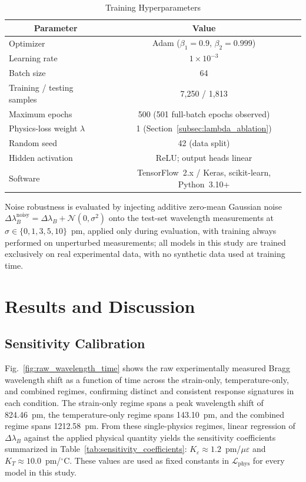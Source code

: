 \documentclass[journal,twoside,web]{ieeecolor}
\begin{document}
\begin{table}[!t]
\caption{Training Hyperparameters}
\label{tab:training_hyperparams}
\centering
\renewcommand{\arraystretch}{1.15}
\begin{tabular}{|l|c|}
\hline
\multicolumn{1}{|c|}{\textbf{Parameter}} & \textbf{Value} \\
\hline
Optimizer & Adam ($\beta_1{=}0.9$, $\beta_2{=}0.999$) \\
Learning rate & $1\times 10^{-3}$ \\
Batch size & 64 \\
Training / testing samples & 7{,}250 / 1{,}813 \\
Maximum epochs & 500 (501 full-batch epochs observed) \\
Physics-loss weight $\lambda$ & 1 (Section~\ref{subsec:lambda_ablation}) \\
Random seed & 42 (data split) \\
Hidden activation & ReLU; output heads linear \\
Software & TensorFlow~2.x / Keras, scikit-learn, Python~3.10+ \\
\hline
\end{tabular}
\end{table}

Noise robustness is evaluated by injecting additive zero-mean Gaussian noise
$\Delta\lambda_B^{\text{noisy}} = \Delta\lambda_B + \mathcal{N}(0,\sigma^2)$
onto the test-set wavelength measurements at $\sigma \in \{0, 1, 3, 5,
10\}$~pm, applied only during evaluation, with training always performed on
unperturbed measurements; all models in this study are trained exclusively
on real experimental data, with no synthetic data used at training time.


\section{Results and Discussion}
\label{sec:results}

\subsection{Sensitivity Calibration}
\label{subsec:sensitivity_calibration}

Fig.~\ref{fig:raw_wavelength_time} shows the raw experimentally measured
Bragg wavelength shift as a function of time across the strain-only,
temperature-only, and combined regimes, confirming distinct and consistent
response signatures in each condition. The strain-only regime spans a peak
wavelength shift of 824.46~pm, the temperature-only regime spans 143.10~pm,
and the combined regime spans 1212.58~pm. From these single-physics regimes,
linear regression of $\Delta\lambda_B$ against the applied physical quantity
yields the sensitivity coefficients summarized in
Table~\ref{tab:sensitivity_coefficients}: $K_\varepsilon \approx
1.2$~pm/$\mu\varepsilon$ and $K_T \approx 10.0$~pm/$^\circ$C. These values
are used as fixed constants in $\mathcal{L}_{\text{phys}}$ for every model
in this study.
\end{document}
